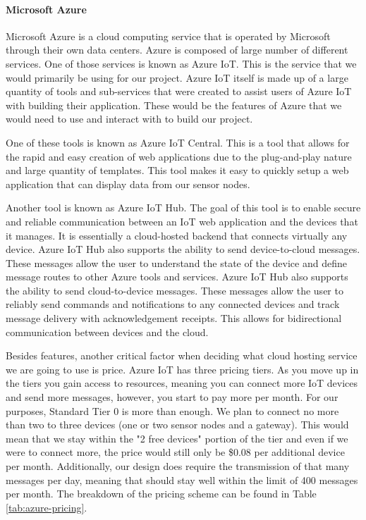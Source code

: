 \paragraph{Microsoft Azure}
Microsoft Azure is a cloud computing service that is operated by Microsoft through their own data centers. Azure is composed of large number of different services. One of those services is known as Azure IoT. This is the service that we would primarily be using for our project. Azure IoT itself is made up of a large quantity of tools and sub-services that were created to assist users of Azure IoT with building their application. These would be the features of Azure that we would need to use and interact with to build our project.

One of these tools is known as Azure IoT Central. This is a tool that allows for the rapid and easy creation of web applications due to the plug-and-play nature and large quantity of templates. This tool makes it easy to quickly setup a web application that can display data from our sensor nodes.

Another tool is known as Azure IoT Hub. The goal of this tool is to enable secure and reliable communication between an IoT web application and the devices that it manages. It is essentially a cloud-hosted backend that connects virtually any device. Azure IoT Hub also supports the ability to send device-to-cloud messages. These messages allow the user to understand the state of the device and define message routes to other Azure tools and services. Azure IoT Hub also supports the ability to send cloud-to-device messages. These messages allow the user to reliably send commands and notifications to any connected devices and track message delivery with acknowledgement receipts. This allows for bidirectional communication between devices and the cloud.

Besides features, another critical factor when deciding what cloud hosting service we are going to use is price. Azure IoT has three pricing tiers. As you move up in the tiers you gain access to resources, meaning you can connect more IoT devices and send more messages, however, you start to pay more per month. For our purposes, Standard Tier 0 is more than enough. We plan to connect no more than two to three devices (one or two sensor nodes and a gateway). This would mean that we stay within the "2 free devices" portion of the tier and even if we were to connect more, the price would still only be \$0.08 per additional device per month. Additionally, our design does require the transmission of that many messages per day, meaning that should stay well within the limit of 400 messages per month. The breakdown of the pricing scheme can be found in Table \ref{tab:azure-pricing}.




